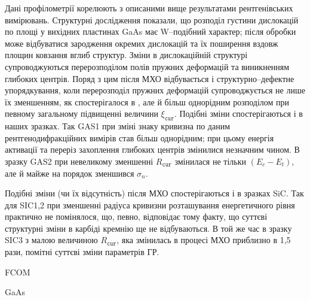 \documentclass[a4paper,14pt,oneside,openany]{memoir}
\begin{document}
Дані профілометрії корелюють з описаними вище результатами рентгенівських вимірювань.
Структурні дослідження показали, що розподіл густини дислокацій по площі у вихідних пластинах GaAs має W--подібний характер;
після обробки може відбуватися зародження окремих дислокацій та їх поширення вздовж площин ковзання вглиб структур.
Зміни в дислокаційній структурі супроводжуються перерозподілом полів пружних деформацій та виникненням глибоких центрів.
Поряд з цим після МХО відбувається і структурно--дефектне упорядкування, коли
перерозподіл пружних деформацій супроводжується не лише їх зменшенням, як спостерігалося в \cite{Bacherikov2003r,Pashkov1994r,Boltovets,Kr1996,Milenin1994,BelyaevIntac},
але й більш однорідним розподілом при певному загальному підвищенні величини $\xi_\mathtt{cur}$.
Подібні зміни спостерігаються і в наших зразках.
Так GAS1 при зміні знаку кривизна по даним рентгенодифракційних вимірів став більш однорідним;
при цьому енергія активації та переріз захоплення глибоких центрів змінилися незначним чином.
В зразку GAS2 при невеликому зменшенні $R_\mathtt{cur}$ змінилася не тільки $(E_c-E_t)$, але й майже на порядок зменшився $\sigma_n$.

Подібні зміни (чи їх відсутність) після МХО спостерігаються і в зразках SiC.
Так для SIC1,2 при зменшенні радіуса кривизни розташування енергетичного рівня практично не помінялося, що, певно,
відповідає тому  факту, що суттєві структурні зміни в карбіді кремнію ще не відбуваються.
В той же час в зразку  SIC3 з малою величиною $R_\mathtt{cur}$, яка змінилась в процесі МХО приблизно в 1,5 рази,
помітні суттєві зміни параметрів ГР.



\cite{KorshunovBook,Kozlovs,Zaveryukhin2002:2,OlikhFTT,Boltovets,Bacherikov2003r,Belyaev1998JTFr,Saiko1993,OlikhSSC,
Rzanov,Shishiyanu,Vaitkus,Samoilov1994,ZOHM2000}

FCOM
\cite{Rjanov1981,paton1993,Vinnik1989,ZOHM2000,BHUNIA1998,Bacherikov2003r,Pashkov1994r,Boltovets,Kr1996,Milenin1994,
BelyaevIntac,ASHKINADZE1996,ProcSPIE,Venger1999,Godwod,ThoricBook,BergBook,Lebed1999,Anikin1991:2,
Anikin1991:3,Lebedev2001}




GaAs
\cite{Neild1991}
\end{document}
